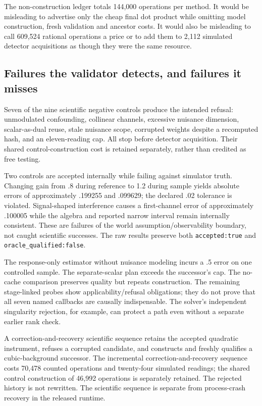 \documentclass[11pt]{article}
\newcommand{\code}[1]{\texttt{#1}}
\begin{document}
The non-construction ledger totals 144,000 operations per method. It would be misleading to advertise only the cheap final dot product while omitting model construction, fresh validation and ancestor costs. It would also be misleading to call 609,524 rational operations a price or to add them to 2,112 simulated detector acquisitions as though they were the same resource.

\subsection{Failures the validator detects, and failures it misses}

Seven of the nine scientific negative controls produce the intended refusal: unmodulated confounding, collinear channels, excessive nuisance dimension, scalar-as-dual reuse, stale nuisance scope, corrupted weights despite a recomputed hash, and an eleven-reading cap. All stop before detector acquisition. Their shared control-construction cost is retained separately, rather than credited as free testing.

Two controls are accepted internally while failing against simulator truth. Changing gain from .8 during reference to 1.2 during sample yields absolute errors of approximately .199255 and .099629; the declared .02 tolerance is violated. Signal-shaped interference causes a first-channel error of approximately .100005 while the algebra and reported narrow interval remain internally consistent. These are failures of the world assumption/observability boundary, not caught scientific successes. The raw results preserve both \code{accepted:true} and \code{oracle\_qualified:false}.

The response-only estimator without nuisance modeling incurs a .5 error on one controlled sample. The separate-scalar plan exceeds the successor's cap. The no-cache comparison preserves quality but repeats construction. The remaining stage-linked probes show applicability/refusal obligations; they do not prove that all seven named callbacks are causally indispensable. The solver's independent singularity rejection, for example, can protect a path even without a separate earlier rank check.

A correction-and-recovery scientific sequence retains the accepted quadratic instrument, refuses a corrupted candidate, and constructs and freshly qualifies a cubic-background successor. The incremental correction-and-recovery sequence costs 70,478 counted operations and twenty-four simulated readings; the shared control construction of 46,992 operations is separately retained. The rejected history is not rewritten. The scientific sequence is separate from process-crash recovery in the released runtime.
\end{document}
